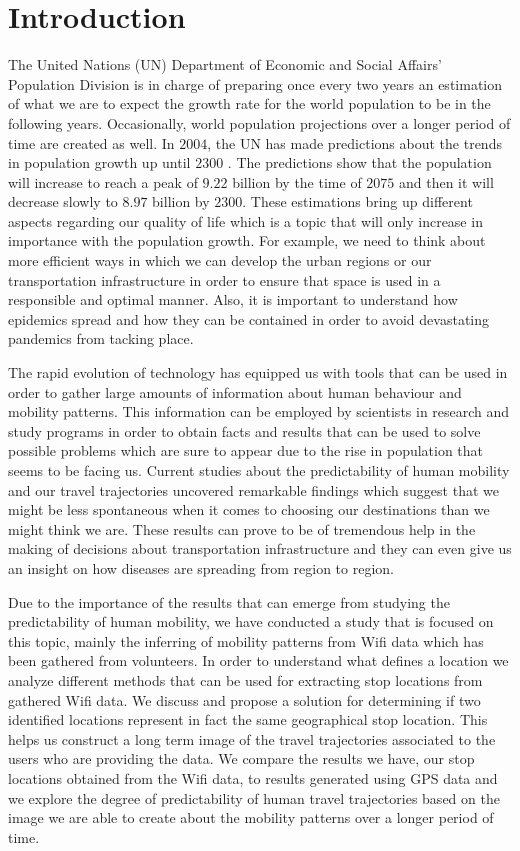 \chapter{Introduction}

The United Nations (UN) Department of Economic and Social Affairs' Population
Division is in charge of preparing once every two years an estimation of what we
are to expect the growth rate for the world population to be in the following
years. Occasionally, world population projections over a longer period of time
are created as well. In $2004$, the UN has made predictions about the trends in
population growth up until $2300$ \cite{UNWp}. The predictions show that the
population will increase to reach a peak of $9.22$ billion by the time of $2075$
and then it will decrease slowly to $8.97$ billion by $2300$. These estimations
bring up different aspects regarding our quality of life which is a topic that
will only increase in importance with the population growth. For example, we
need to think about more efficient ways in which we can develop the urban
regions or our transportation infrastructure in order to ensure that space is
used in a responsible and optimal manner. Also, it is important to understand
how epidemics spread and how they can be contained in order to avoid devastating
pandemics from tacking place.

The rapid evolution of technology has equipped us with tools that can be used in
order to gather large amounts of information about human behaviour and mobility
patterns. This information can be employed by scientists in research and study
programs in order to obtain facts and results that can be used to solve possible
problems which are sure to appear due to the rise in population that seems to be
facing us. Current studies about the predictability of human mobility and our
travel trajectories uncovered remarkable findings which suggest that we might be
less spontaneous when it comes to choosing our destinations than we might think
we are. These results can prove to be of tremendous help in the making of
decisions about transportation infrastructure and they can even give us an
insight on how diseases are spreading from region to region.

Due to the importance of the results that can emerge from studying the
predictability of human mobility, we have conducted a study that is focused on
this topic, mainly the inferring of mobility patterns from Wifi data which has
been gathered from volunteers. In order to understand what defines a location
we analyze different methods that can be used for extracting stop locations from
gathered Wifi data. We discuss and propose a solution for determining if two
identified locations represent in fact the same geographical stop location. This
helps us construct a long term image of the travel trajectories associated to
the users who are providing the data. We compare the results we have, our stop
locations obtained from the Wifi data, to results generated using GPS data and
we explore the degree of predictability of human travel trajectories based on
the image we are able to create about the mobility patterns over a longer period
of time.


